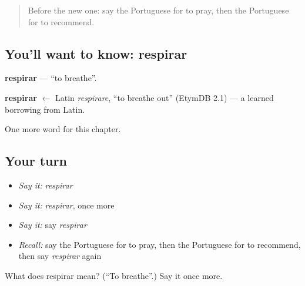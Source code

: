\begin{quote}
Before the new one: say the Portuguese for to pray, then the Portuguese for to recommend.
\end{quote}

\subsection*{You'll want to know: respirar}
\textbf{respirar} — \textquotedblleft{}to breathe\textquotedblright{}.

\begin{cousinweb}
\textbf{respirar} $\leftarrow$ Latin \emph{respirare}, \textquotedblleft{}to breathe out\textquotedblright{} (EtymDB 2.1) — a learned borrowing from Latin.
\end{cousinweb}

\begin{grammarlens}[title={What you've built}]
One more word for this chapter.
\end{grammarlens}

\subsection*{Your turn}
\begin{itemize}
\raggedright
  \item \emph{Say it:} \emph{respirar}
  \item \emph{Say it:} \emph{respirar}, once more
  \item \emph{Say it:} say \emph{respirar}
  \item \emph{Recall:} say the Portuguese for to pray, then the Portuguese for to recommend, then say \emph{respirar} again
\end{itemize}

\begin{tcolorbox}[breakable,colback=teal!4,colframe=teal!35!black,title={Before you move on}]
What does respirar mean? (\textquotedblleft{}To breathe\textquotedblright{}.) Say it once more.
\end{tcolorbox}
